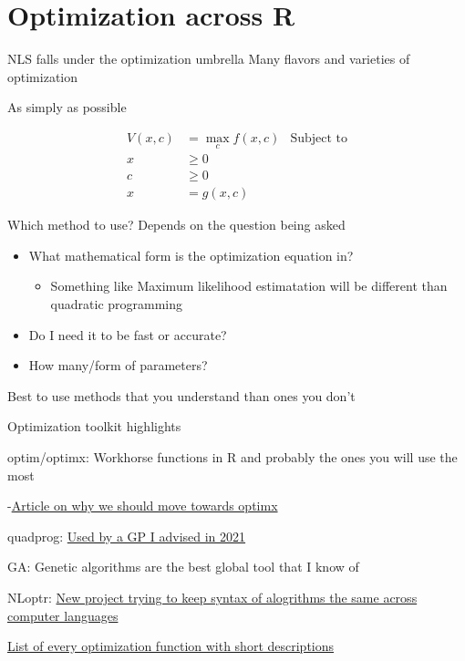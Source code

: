 \documentclass[
  ignorenonframetext,
]{beamer}
\providecommand{\tightlist}{%
  \setlength{\itemsep}{0pt}\setlength{\parskip}{0pt}}
\begin{document}
\hypertarget{optimization-across-r}{%
\section{Optimization across R}\label{optimization-across-r}}

\begin{frame}{NLS falls under the optimization umbrella}
\protect\hypertarget{nls-falls-under-the-optimization-umbrella}{}
Many flavors and varieties of optimization

As simply as possible

\[
\begin{aligned}
V(x,c)&=\max_cf(x,c) &\text{Subject to}\\
x&\ge0 \\
c&\ge 0  \\
x&=g(x,c)
\end{aligned}
\]
\end{frame}

\begin{frame}{Which method to use?}
\protect\hypertarget{which-method-to-use}{}
Depends on the question being asked

\begin{itemize}
\item
  What mathematical form is the optimization equation in?

  \begin{itemize}
  \tightlist
  \item
    Something like Maximum likelihood estimatation will be different
    than quadratic programming
  \end{itemize}
\item
  Do I need it to be fast or accurate?
\item
  How many/form of parameters?
\end{itemize}

Best to use methods that you understand than ones you don't
\end{frame}

\begin{frame}{Optimization toolkit highlights}
\protect\hypertarget{optimization-toolkit-highlights}{}
\small

optim/optimx: Workhorse functions in R and probably the ones you will
use the most

-\href{https://www.jstatsoft.org/article/download/v060i02/788}{Article
on why we should move towards optimx}

quadprog: \href{https://www.fishwallet.net/}{Used by a GP I advised in
2021}

GA: Genetic algorithms are the best global tool that I know of

NLoptr:
\href{https://nlopt.readthedocs.io/en/latest/NLopt_Introduction/}{New
project trying to keep syntax of alogrithms the same across computer
languages}

\href{https://cran.r-project.org/web/views/Optimization.html}{List of
every optimization function with short descriptions}
\end{frame}
\end{document}

